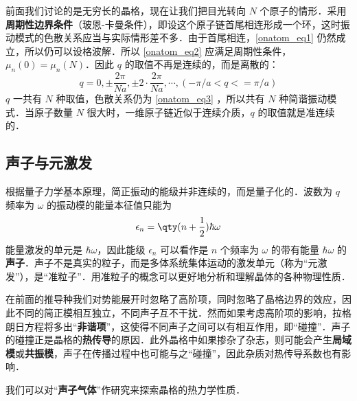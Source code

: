 前面我们讨论的是无穷长的晶格，现在让我们把目光转向 $N$ 个原子的情形．采用\textbf{周期性边界条件}（玻恩-卡曼条件），即设这个原子链首尾相连形成一个环，这时振动模式的色散关系应当与实际情形差不多．由于首尾相连，\autoref{onatom_eq1} 仍然成立，所以仍可以设格波解．所以 \autoref{onatom_eq2} 应满足周期性条件，$\mu_n(0)=\mu_n(N)$．因此 $q$ 的取值不再是连续的，而是离散的：
\begin{equation}
q=0,\pm \frac{2\pi}{Na},\pm 2\cdot \frac{2\pi}{Na},\cdots, (-\pi/a<q<=\pi/a)
\end{equation}
$q$ 一共有 $N$ 种取值，色散关系仍为 \autoref{onatom_eq3} ，所以共有 $N$ 种简谐振动模式．当原子数量 $N$ 很大时，一维原子链近似于连续介质，$q$ 的取值就是准连续的．
\subsection{声子与元激发}

根据量子力学基本原理，简正振动的能级并非连续的，而是量子化的．波数为 $q$ 频率为 $\omega$ 的振动模的能量本征值只能为
\begin{equation}
\epsilon_n=\qty(n+\frac{1}{2})\hbar\omega
\end{equation}
能量激发的单元是 $\hbar\omega$，因此能级 $\epsilon_n$ 可以看作是 $n$ 个频率为 $\omega$ 的带有能量 $\hbar\omega$ 的\textbf{声子}．声子不是真实的粒子，而是多体系统集体运动的激发单元（称为“元激发”），是“准粒子”．用准粒子的概念可以更好地分析和理解晶体的各种物理性质．

在前面的推导种我们对势能展开时忽略了高阶项，同时忽略了晶格边界的效应，因此不同的简正模相互独立，不同声子互不干扰．然而如果考虑高阶项的影响，拉格朗日方程将多出“\textbf{非谐项}”，这使得不同声子之间可以有相互作用，即“碰撞”．声子的碰撞正是晶格的\textbf{热传导}的原因．此外晶格中如果掺杂了杂志，则可能会产生\textbf{局域模}或\textbf{共振模}，声子在传播过程中也可能与之“碰撞”，因此杂质对热传导系数也有影响．

我们可以对“\textbf{声子气体}”作研究来探索晶格的热力学性质．